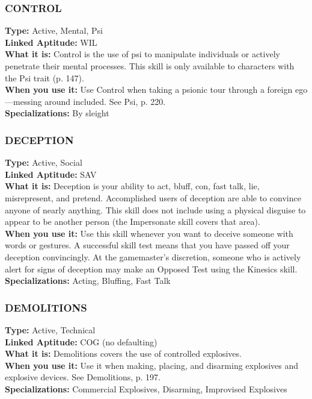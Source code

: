 \subsubsection{CONTROL}
\textbf{Type:} Active, Mental, Psi
\\ \textbf{Linked Aptitude:} WIL
\\ \textbf{What it is:} Control is the use of psi to manipulate
individuals or actively penetrate their mental processes. This skill is only available to characters with
the Psi trait (p. 147).
\\ \textbf{When you use it:} Use Control when taking a psionic
tour through a foreign ego—messing around included.
See Psi, p. 220.
\\ \textbf{Specializations:} By sleight

\subsubsection{DECEPTION}
\textbf{Type:} Active, Social
\\ \textbf{Linked Aptitude:} SAV
\\ \textbf{What it is:} Deception is your ability to act, bluff,
con, fast talk, lie, misrepresent, and pretend. Accomplished users of deception are able to convince anyone
of nearly anything. This skill does not include using a
physical disguise to appear to be another person (the
Impersonate skill covers that area).
\\ \textbf{When you use it:} Use this skill whenever you want
to deceive someone with words or gestures. A successful skill test means that you have passed off your deception convincingly. At the gamemaster’s discretion,
someone who is actively alert for signs of deception
may make an Opposed Test using the Kinesics skill.
\\ \textbf{Specializations:} Acting, Bluffing, Fast Talk

\subsubsection{DEMOLITIONS}
\textbf{Type:} Active, Technical
\\ \textbf{Linked Aptitude:} COG (no defaulting)
\\ \textbf{What it is:} Demolitions covers the use of controlled
explosives.
\\ \textbf{When you use it:} Use it when making, placing, and
disarming explosives and explosive devices. See Demolitions, p. 197.
\\ \textbf{Specializations:} Commercial Explosives, Disarming,
Improvised Explosives

